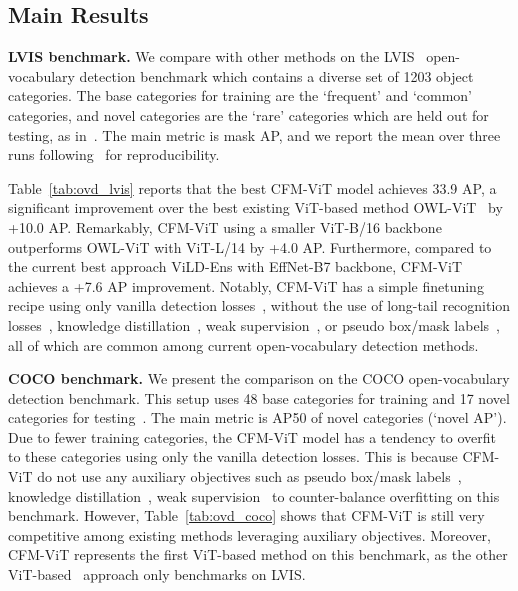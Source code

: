 \documentclass[10pt,twocolumn,letterpaper]{article}
\newcommand{\tabref}[1]{Table~\ref{#1}}
\renewcommand{\paragraph}[1]{\vspace{1mm}\noindent\textbf{#1}}
\newcommand{\ours}{CFM-ViT\xspace}
\begin{document}
\subsection{Main Results}
\label{sec:exp:ovd}
\paragraph{LVIS benchmark.}\quad
We compare with other methods on the LVIS~\cite{lvis} open-vocabulary detection benchmark which contains a diverse set of 1203 object categories. The base categories  for training are the `frequent' and `common' categories, and novel categories  are the `rare' categories which are held out for testing, as in~\cite{gu2022openvocabulary,zhong2021learning,du2022learning}. The main metric is mask AP, and we report the mean over three runs following~\cite{gu2022openvocabulary} for reproducibility.

\tabref{tab:ovd_lvis} reports that the best \ours model achieves 33.9 AP, a significant improvement over the best existing ViT-based method OWL-ViT~\cite{minderer2022simple} by {+10.0} AP. Remarkably, \ours using a smaller ViT-B/16 backbone outperforms OWL-ViT with ViT-L/14 by {+4.0} AP. Furthermore, compared to the current best approach ViLD-Ens with EffNet-B7 backbone, \ours achieves a {+7.6} AP improvement. Notably, \ours has a simple finetuning recipe using only vanilla detection losses~\cite{he2017mask}, without the use of long-tail recognition losses~\cite{minderer2022simple,zhong2021regionclip,zhou2022detecting}, knowledge distillation~\cite{gu2022openvocabulary,du2022learning}, weak supervision~\cite{zhou2022detecting}, or pseudo box/mask labels~\cite{zhong2021regionclip,zhao2022exploiting,rasheed2022bridging}, all of which are common among current open-vocabulary detection methods.

\paragraph{COCO benchmark.}\quad
We present the comparison on the COCO open-vocabulary detection benchmark. This setup uses 48 base categories for training and 17 novel categories for testing~\cite{gu2022openvocabulary}. The main metric is AP50 of novel categories (`novel AP'). Due to fewer training categories, the \ours model has a tendency to overfit to these categories using only the vanilla detection losses. This is because \ours do not use any auxiliary objectives such as pseudo box/mask labels~\cite{huynh2022open,feng2022promptdet,zhong2021regionclip,zhao2022exploiting,rasheed2022bridging}, knowledge distillation~\cite{gu2022openvocabulary,du2022learning}, weak supervision~\cite{zhou2022detecting} to counter-balance overfitting on this benchmark. However, \tabref{tab:ovd_coco} shows that \ours is still very competitive among existing methods leveraging auxiliary objectives. Moreover, \ours represents the first ViT-based method on this benchmark, as the other ViT-based~\cite{minderer2022simple} approach only benchmarks on LVIS.
\end{document}
